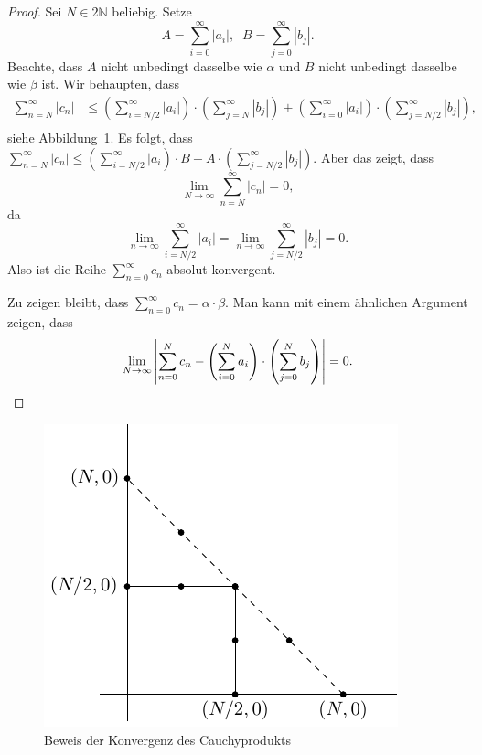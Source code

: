 \documentclass[../main.tex]{subfiles}
\begin{document}
\begin{proof}
  Sei $N \in 2\mathbb{N}$ beliebig.
  Setze
   \[
     A = \sum_{i=0}^{\infty} |a_i|, \;\; 
     B = \sum_{j=0}^{\infty} |b_j|.
   \]
   Beachte, dass $A$ nicht unbedingt dasselbe
   wie $\alpha$ und $B$ nicht unbedingt dasselbe
   wie $\beta$ ist.
   Wir behaupten, dass
   \begin{align*}
     \sum_{n=N}^{\infty} |c_n| & \leq
     \left( \sum_{i=N/2}^{\infty} |a_i| \right)
     \cdot
     \left( \sum_{j=N}^{\infty} |b_j| \right)
     +
     \left( \sum_{i=0}^{\infty} |a_i| \right)
     \cdot
     \left(
     \sum_{j=N/2}^{\infty} |b_j|\right),\\
   \end{align*}
   siehe Abbildung~\ref{fig:cauchy-proof}.
   Es folgt, dass
   $\sum_{n=N}^{\infty} |c_n| \leq
   \left( \sum_{i=N/2}^{\infty} |a_i \right) \cdot B
   + A \cdot
   \left( \sum_{j=N/2}^{\infty} |b_j| \right).$
   Aber das zeigt, dass
   \[
     \lim_{N \to \infty} \sum_{n=N}^{\infty} |c_n| = 0,
   \]
   da
   \[
     \lim_{n \to \infty} \sum_{i=N/2}^{\infty} |a_i| =
     \lim_{n \to \infty} \sum_{j=N/2}^{\infty} |b_j| = 0.
   \]
   Also ist die Reihe $\sum_{n=0}^{\infty} c_n$ absolut
   konvergent.

   Zu zeigen bleibt, dass $\sum_{n=0}^{\infty} c_n = \alpha
   \cdot \beta$. Man kann mit einem ähnlichen Argument
   zeigen, dass
   \[
     \lim_{N \to \infty}
     \left| 
       \sum_{n=0}^{N} c_n -
       \left( \sum_{i=0}^{N} a_i \right)
       \cdot
       \left( \sum_{j=0}^{N} b_j \right)
     \right| = 0. \qedhere
   \]
\end{proof}

\begin{figure}[htb]
  \centering
  \includegraphics{chapter2/images/cauchy-thm}
  \caption{Beweis der Konvergenz des Cauchyprodukts}%
  \label{fig:cauchy-proof}
\end{figure}
\end{document}
